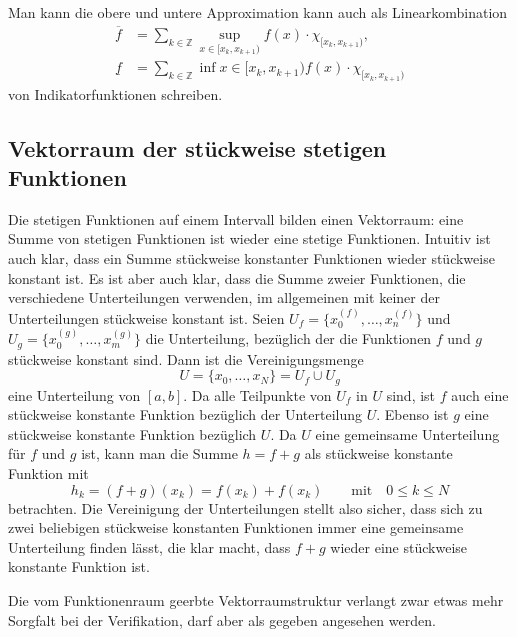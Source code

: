 Man kann die obere und untere Approximation kann auch als Linearkombination
\begin{align*}
\overline{f}
&=
\sum_{k\in\mathbb Z} \sup_{x\in[x_k,x_{k+1})}f(x)\cdot \chi_{[x_k,x_{k+1})},
\\
\underline{f}
&=
\sum_{k\in\mathbb Z} \inf{x\in[x_k,x_{k+1})}f(x)\cdot \chi_{[x_k,x_{k+1})}
\end{align*}
von Indikatorfunktionen schreiben.

\subsection{Vektorraum der stückweise stetigen Funktionen}
Die stetigen Funktionen auf einem Intervall bilden einen Vektorraum: eine
Summe von stetigen Funktionen ist wieder eine stetige Funktionen.
Intuitiv ist auch klar, dass ein Summe stückweise konstanter Funktionen
wieder stückweise konstant ist.
Es ist aber auch klar, dass die Summe zweier Funktionen, die verschiedene
Unterteilungen verwenden, im allgemeinen mit keiner der Unterteilungen
stückweise konstant ist.
Seien $U_f=\{x_0^{(f)},\dots,x_n^{(f)}\}$ und
$U_g=\{x_0^{(g)},\dots,x_m^{(g)}\}$ die Unterteilung, bezüglich der 
die Funktionen $f$ und $g$ stückweise konstant sind.
Dann ist die Vereinigungsmenge
\[
U= \{x_0,\dots,x_N\} = U_f\cup U_g
\]
eine Unterteilung von $[a,b]$.
Da alle Teilpunkte von $U_f$ in $U$ sind, ist $f$ auch eine stückweise
konstante Funktion bezüglich der Unterteilung $U$. 
Ebenso ist $g$ eine stückweise konstante Funktion bezüglich $U$.
Da $U$ eine gemeinsame Unterteilung für $f$ und $g$ ist, kann man
die Summe $h=f+g$ als stückweise konstante Funktion mit
\[
h_k
=
(f+g)(x_k)
= 
f(x_k) + f(x_k)
\qquad\text{mit}\quad
0\le k\le N
\]
betrachten.
Die Vereinigung der Unterteilungen stellt also sicher, dass sich
zu zwei beliebigen stückweise konstanten Funktionen immer eine
gemeinsame Unterteilung finden lässt, die klar macht, dass $f+g$
wieder eine stückweise konstante Funktion ist.

Die vom Funktionenraum geerbte Vektorraumstruktur verlangt zwar etwas
mehr Sorgfalt bei der Verifikation, darf aber als gegeben angesehen
werden.

